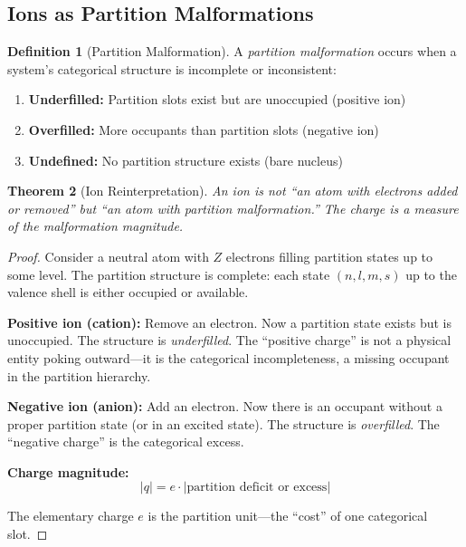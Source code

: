 \documentclass[twocolumn,10pt,a4paper]{article}
\newtheorem{theorem}{Theorem}[section]
\theoremstyle{definition}
\newtheorem{definition}[theorem]{Definition}
\theoremstyle{remark}
\begin{document}
\subsection{Ions as Partition Malformations}

\begin{definition}[Partition Malformation]
\label{def:malformation}
A \emph{partition malformation} occurs when a system's categorical structure is incomplete or inconsistent:
\begin{enumerate}
    \item \textbf{Underfilled:} Partition slots exist but are unoccupied (positive ion)
    \item \textbf{Overfilled:} More occupants than partition slots (negative ion)
    \item \textbf{Undefined:} No partition structure exists (bare nucleus)
\end{enumerate}
\end{definition}

\begin{theorem}[Ion Reinterpretation]
\label{thm:ion_reinterpret}
An ion is not ``an atom with electrons added or removed'' but ``an atom with partition malformation.'' The charge is a measure of the malformation magnitude.
\end{theorem}

\begin{proof}
Consider a neutral atom with $Z$ electrons filling partition states up to some level. The partition structure is complete: each state $(n, l, m, s)$ up to the valence shell is either occupied or available.

\textbf{Positive ion (cation):}
Remove an electron. Now a partition state exists but is unoccupied. The structure is \emph{underfilled}. The ``positive charge'' is not a physical entity poking outward---it is the categorical incompleteness, a missing occupant in the partition hierarchy.

\textbf{Negative ion (anion):}
Add an electron. Now there is an occupant without a proper partition state (or in an excited state). The structure is \emph{overfilled}. The ``negative charge'' is the categorical excess.

\textbf{Charge magnitude:}
\begin{equation}
    |q| = e \cdot |\text{partition deficit or excess}|
\end{equation}

The elementary charge $e$ is the partition unit---the ``cost'' of one categorical slot.
\end{proof}
\end{document}
